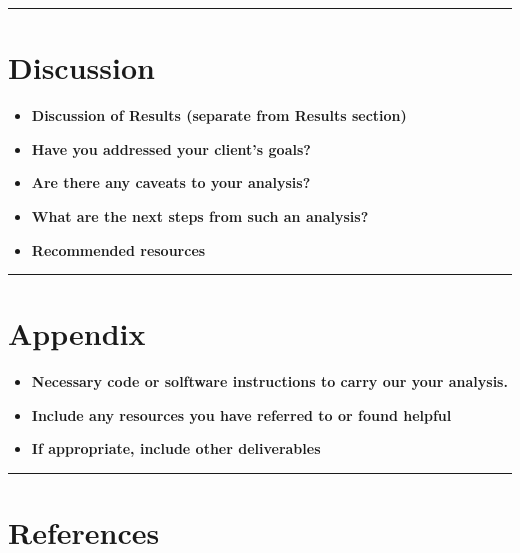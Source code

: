 \documentclass[12pt,]{article}
\providecommand{\tightlist}{%
  \setlength{\itemsep}{0pt}\setlength{\parskip}{0pt}}
\begin{document}
\begin{center}\rule{0.5\linewidth}{\linethickness}\end{center}

\hypertarget{discussion}{%
\section{Discussion}\label{discussion}}

\begin{itemize}
\tightlist
\item
  \textbf{Discussion of Results (separate from Results section)}
\item
  \textbf{Have you addressed your client's goals?}
\item
  \textbf{Are there any caveats to your analysis?}
\item
  \textbf{What are the next steps from such an analysis?}
\item
  \textbf{Recommended resources}
\end{itemize}

\begin{center}\rule{0.5\linewidth}{\linethickness}\end{center}

\hypertarget{appendix}{%
\section{Appendix}\label{appendix}}

\begin{itemize}
\tightlist
\item
  \textbf{Necessary code or solftware instructions to carry our your analysis.}\\
\item
  \textbf{Include any resources you have referred to or found helpful}
\item
  \textbf{If appropriate, include other deliverables}
\end{itemize}

\begin{center}\rule{0.5\linewidth}{\linethickness}\end{center}

\hypertarget{references}{%
\section{References}\label{references}}


\end{document}
